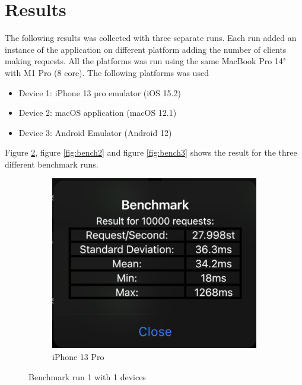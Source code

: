 \section{Results}
\label{ch:results}
\noindent

The following results was collected with three separate runs. Each run added an instance of the application on different platform adding the number of clients making requests. All the platforms was run using the same MacBook Pro 14" with M1 Pro (8 core). The following platforms was used
\begin{itemize}
    \item Device 1: iPhone 13 pro emulator (iOS 15.2)
    \item Device 2: macOS application (macOS 12.1)
    \item Device 3: Android Emulator (Android 12)
\end{itemize}

Figure \ref{fig:bench1}, figure \ref{fig:bench2} and figure \ref{fig:bench3} shows the result for the three different benchmark runs.

\begin{figure}[H]
    \centering
    \begin{subfigure}{0.48\textwidth}
        \centering
        \includegraphics[width=1\textwidth]{img/Run1Dev1.png}
        \caption{iPhone 13 Pro}
        \label{fig:bench1:dev1}
    \end{subfigure}
    \caption{Benchmark run 1 with 1 devices}
    \label{fig:bench1}
\end{figure}

